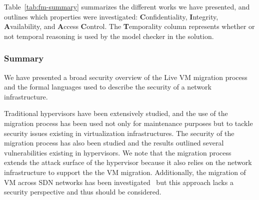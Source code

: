 Table~\ref{tab:fm-summary} summarizes the different works we have presented, and outlines which properties were investigated: \textbf{C}onfidentiality, \textbf{I}ntegrity, \textbf{A}vailability, and \textbf{A}ccess \textbf{C}ontrol. 
The \textbf{T}emporality column represents whether or not temporal reasoning is used by the model checker in the solution.
\begin{table}[ht]
\caption{Summary of formal models}
\label{tab:fm-summary}
\end{table}

\subsubsection{Summary}
We have presented a broad security overview of the Live VM migration process and the formal languages used to describe the security of a network infrastructure.

Traditional hypervisors have been extensively studied, and the use of the migration process has been used not only for maintenance purposes but to tackle security issues existing in virtualization infrastructures.
The security of the migration process has also been studied and the results outlined several vulnerabilities existing in hypervisors.
We note that the migration process extends the attack surface of the hypervisor because it also relies on the network infrastructure to support the the VM migration.
Additionally, the migration of VM across SDN networks has been investigated~\cite{Datacenters2014,Lin2013,Ibn-Khedher2015} but this approach lacks a security perspective and thus should be considered.

